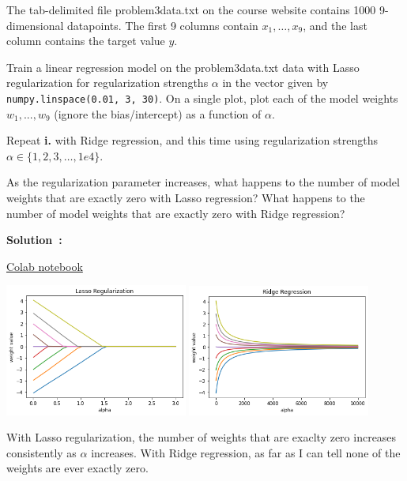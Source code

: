 \documentclass{article}
\newcounter{problem}[section]
\newcounter{subproblem}[problem]
\newenvironment{solution}[1][]
    {\par\medskip \begin{mdframed}\textbf{Solution~\Alph{problem}#1:} \begin{em}}
    {\end{em}\medskip\end{mdframed}\medskip}
\begin{document}
\problem[11] 
The tab-delimited file problem3data.txt on the course website contains 1000 9-dimensional datapoints.  The first 9 columns contain $x_1,\ldots,x_9$, and the last column contains the target value $y$.

\subproblem
Train a linear regression model on the problem3data.txt data with Lasso regularization for regularization strengths $\alpha$ in the vector given by \texttt{numpy.linspace(0.01, 3, 30)}.
On a single plot, plot each of the model weights $w_1, ..., w_9$ (ignore the bias/intercept) as a function of $\alpha$.

\subproblem
Repeat \textbf{i.} with Ridge regression, and this time using regularization strengths $\alpha \in \{1, 2, 3, \ldots, 1e4\}$.


\subproblem
As the regularization parameter increases, what happens to the number of model weights that are exactly zero with Lasso regression?
What happens to the number of model weights that are exactly zero with Ridge regression?

\medskip
\lstset{
  basicstyle=\small\ttfamily,
  breaklines=true,
  columns=fullflexible
}

\begin{solution}
  \href{https://colab.research.google.com/drive/1KgRAuNPYP88c8LhAu-vSoqk85wm7K7sM?usp=sharing}{Colab notebook}

  \includegraphics[width=0.45\textwidth]{images/3a_lasso.png}
  \includegraphics[width=0.45\textwidth]{images/3a_ridge.png}

  With Lasso regularization, the number of weights that are exaclty zero increases consistently as $\alpha$ increases.
  With Ridge regression, as far as I can tell none of the weights are ever exactly zero.
\end{solution}
\end{document}
